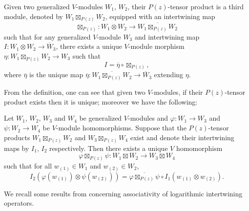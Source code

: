 \documentclass[12pt]{article}
\begin{document}
\begin{defn}
   {\rm Given two generalized $V$-modules $W_1$,
  $W_2$, their $P(z)$-tensor product is a third module, denoted by
  $W_1\boxtimes_{P(z)} W_2$, equipped with an intertwining map
  \begin{equation*}
    \boxtimes_{P(z)} : W_1\otimes W_2 \rightarrow
      \overline {W_1\boxtimes_{P(z)} W_2}
  \end{equation*}
  such that for any generalized $V$-module $W_3$ and intertwining map
  $I: W_1\otimes W_2 \rightarrow \overline W_3$, there exists a unique
  $V$-module morphism $\eta : W_1\boxtimes_{P(z)}W_2 \rightarrow W_3$
  such that
  \begin{equation*}
    I = \overline\eta\circ \boxtimes_{P(z)},
  \end{equation*}
  where $\overline \eta$ is the unique map $\overline \eta :
    \overline {W_1\boxtimes_{P(z)} W_2} \rightarrow \overline W_3$
  extending $\eta$.
  }
\end{defn}
From the definition, one can see that given two $V$-modules, if their
$P(z)$-tensor product exists then it is unique; moreover we have the
following:
\begin{prop}\label{tensor-morphism}
  Let $W_1$, $W_2$, $W_3$ and $W_4$ be generalized $V$-modules and
  $\varphi:W_1\rightarrow W_3$ and $\psi:W_2\rightarrow W_4$
  be $V$-module homomorphisms.
  Suppose that the $P(z)$-tensor products $W_1\boxtimes_{P(z)}W_2$ and
  $W_3\boxtimes_{P(z)}W_4$ exist and denote their intertwining maps by
  $I_1$, $I_2$ respectively.
  Then there exists a unique $V$ homomorphism
  \begin{equation*}
    \varphi\boxtimes_{P(z)}\psi : W_1\boxtimes W_2 \rightarrow W_3\boxtimes W_4
  \end{equation*}
  such that for all $w_{(1)}\in W_1$ and $w_{(2)}\in W_2$,
  \begin{equation*}
    I_2(\varphi(w_{(1)})\otimes\psi(w_{(2)})) =
      \overline {\varphi\boxtimes_{P(z)}\psi}\circ I_1(w_{(1)}\otimes w_{(2)}).
  \end{equation*}
\end{prop}
We recall some results from \cite{HLZ5} concerning associativity of logarithmic
intertwining operators.
\end{document}
